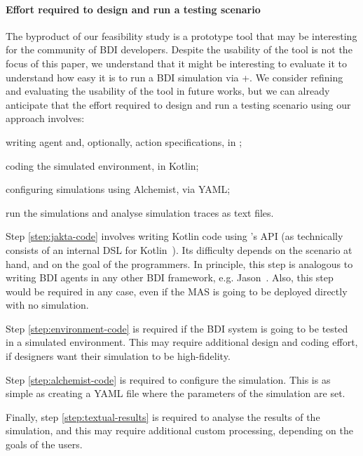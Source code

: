 \paragraph{Effort required to design and run a testing scenario}

The byproduct of our feasibility study is a prototype tool
that may be interesting for the community of \ac{BDI} developers.
%
Despite the usability of the tool is not the focus of this paper,
we understand that it might be interesting to evaluate it
to understand how easy it is to run a \ac{BDI} simulation via \jakta{}+\alchemist{}.
%
We consider refining and evaluating the usability of the tool in future works,
but we can already anticipate that the effort required to design and run a testing scenario
using our approach involves:
%
\begin{inlinelist}
    \item\label{step:jakta-code} writing agent and, optionally, action specifications, in \jakta{};
    \item\label{step:environment-code} coding the simulated environment, in Kotlin;
    \item\label{step:alchemist-code} configuring simulations using Alchemist, via YAML;
    \item\label{step:textual-results} run the simulations and analyse simulation traces as text files.
\end{inlinelist}

Step \ref{step:jakta-code} involves writing Kotlin code using \jakta{}'s \ac{API}
(as \jakta{} technically consists of an internal \ac{DSL} for Kotlin~\cite{SNCS:JaktaJournal}).
%
Its difficulty depends on the scenario at hand, and on the goal of the programmers.
%
In principle, this step is analogous to writing \ac{BDI} agents in any other \ac{BDI} framework,
e.g. Jason~\cite{BordiniHW2007}.
%
Also, this step would be required in any case, even if the \ac{MAS} is going to be deployed directly with no simulation.

Step \ref{step:environment-code} is required if the \ac{BDI} system is going to be tested in a simulated environment.
%
This may require additional design and coding effort, if designers want their simulation to be high-fidelity.

Step \ref{step:alchemist-code} is required to configure the simulation.
%
This is as simple as creating a YAML file where the parameters of the simulation are set.

Finally,
step \ref{step:textual-results} is required to analyse the results of the simulation,
and this may require additional custom processing,
depending on the goals of the users.


